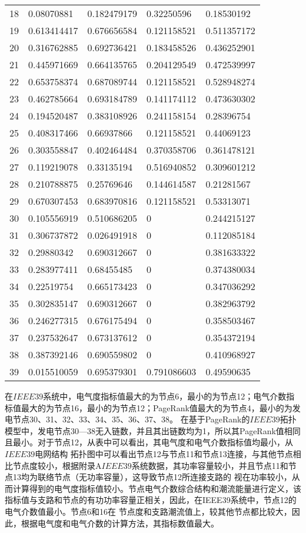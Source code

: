 \begin{table}[H]
\begin{tabular}{C{1.5cm}C{2.75cm}C{2.75cm}C{3.25cm}C{2.75cm}}
  18 & 0.08070881  & 0.182479179 & 0.32250596  & 0.18530192 \\ 
  19 & 0.613414417 & 0.676656584 & 0.121158521 & 0.511357172 \\ 
  20 & 0.316762885 & 0.692736421 & 0.183458526 & 0.436252901 \\ 
  21 & 0.445971669 & 0.664135765 & 0.204129549 & 0.472539997 \\ 
  22 & 0.653758374 & 0.687089744 & 0.121158521 & 0.528948274 \\ 
  23 & 0.462785664 & 0.693184789 & 0.141174112 & 0.473630302 \\ 
  24 & 0.194520487 & 0.383108926 & 0.241158154 & 0.28396754 \\ 
  25 & 0.408317466 & 0.66937866  & 0.121158521 & 0.44069123 \\ 
  26 & 0.303558847 & 0.402464484 & 0.370358706 & 0.361478121 \\ 
  27 & 0.119219078 & 0.33135194  & 0.516940852 & 0.309601212 \\ 
  28 & 0.210788875 & 0.25769646  & 0.144614587 & 0.21281567 \\ 
  29 & 0.670307453 & 0.683970816 & 0.121158521 & 0.53313071 \\ 
  30 & 0.105556919 & 0.510686205 & 0           & 0.244215127 \\ 
  31 & 0.306737872 & 0.026491918 & 0           & 0.112085184 \\ 
  32 & 0.29880342  & 0.690312667 & 0           & 0.381633322 \\ 
  33 & 0.283977411 & 0.68455485  & 0           & 0.374380034 \\ 
  34 & 0.22519754  & 0.665173423 & 0           & 0.347036292 \\ 
  35 & 0.302835147 & 0.690312667 & 0           & 0.382963792 \\ 
  36 & 0.246277315 & 0.676175494 & 0           & 0.358503467 \\ 
  37 & 0.237532647 & 0.673137612 & 0           & 0.354372194 \\ 
  38 & 0.387392146 & 0.690559802 & 0           & 0.410968927 \\ 
  39 & 0.015510059 & 0.695379301 & 0.791086603 & 0.49590635 \\ 
  \bottomrule
  \end{tabular}
\end{table}
在$IEEE39$系统中，电气度指标值最大的为节点6，最小的为节点12；电气介数指标值最大的为节点16，最小的为节点12；PageRank值最大的为节点4，最小的为发电节点30、31、32、33、34、35、36、37、38。
在基于PageRank的$IEEE39$拓扑模型中，发电节点30—38无入链数，并且其出链数均为1，所以其PageRank值相同且最小。对于节点12，从表中可以看出，其电气度和电气介数指标值均最小，从$IEEE39$电网结构
拓扑图中可以看出节点12与节点11和节点13连接，与其他节点相比节点度较小，根据附录A$IEEE39$系统数据，其功率容量较小，并且节点11和节点13均为联络节点（无功率容量），这导致节点12所连接支路的
视在功率较小，从而计算得到的电气度指标值较小。节点电气介数综合结构和潮流能量进行定义，该指标值与支路和节点的有功功率容量正相关，因此，在IEEE39系统中，节点12的电气介数值最小。节点6和16在
节点度和支路潮流值上，较其他节点都比较大，因此，根据电气度和电气介数的计算方法，其指标数值最大。

